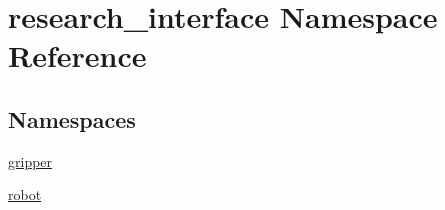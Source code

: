 \hypertarget{namespaceresearch__interface}{}\section{research\+\_\+interface Namespace Reference}
\label{namespaceresearch__interface}
\subsection*{Namespaces}
\begin{DoxyCompactItemize}
\item 
 \hyperlink{namespaceresearch__interface_1_1gripper}{gripper}
\item 
 \hyperlink{namespaceresearch__interface_1_1robot}{robot}
\end{DoxyCompactItemize}
